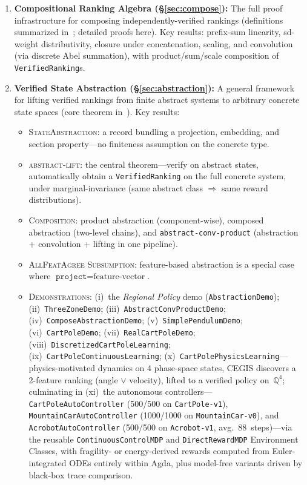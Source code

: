 \documentclass[9pt,a4paper]{article}
\theoremstyle{plain}
\theoremstyle{definition}
\theoremstyle{remark}
\begin{document}
\begin{enumerate}
\item \textbf{Compositional Ranking Algebra (\S\ref{sec:compose}):} The full proof infrastructure for composing independently-verified rankings (definitions summarized in~\cite{CSHRLSuccessor}; detailed proofs here).  Key results: prefix-sum linearity, sd-weight distributivity, closure under concatenation, scaling, and convolution (via discrete Abel summation), with product/sum/scale composition of \texttt{VerifiedRanking}s.

\item \textbf{Verified State Abstraction (\S\ref{sec:abstraction}):} A general framework for lifting verified rankings from finite abstract systems to arbitrary concrete state spaces (core theorem in~\cite{CSHRLSuccessor}).  Key results:
\begin{itemize}
\item \textsc{StateAbstraction}: a record bundling a projection, embedding, and section property---no finiteness assumption on the concrete type.
\item \textsc{abstract-lift}: the central theorem---verify on abstract states, automatically obtain a \texttt{VerifiedRanking} on the full concrete system, under marginal-invariance (same abstract class $\Rightarrow$ same reward distributions).
\item \textsc{Composition}: product abstraction (component-wise), composed abstraction (two-level chains), and \texttt{abstract-conv-product} (abstraction + convolution + lifting in one pipeline).
\item \textsc{AllFeatAgree Subsumption}: feature-based abstraction is a special case where $\texttt{project} = \text{feature-vector}$.
\item \textsc{Demonstrations}: (i)~the \emph{Regional Policy} demo (\texttt{AbstractionDemo}); (ii)~\texttt{ThreeZoneDemo}; (iii)~\texttt{AbstractConvProductDemo}; (iv)~\texttt{ComposeAbstractionDemo}; (v)~\texttt{SimplePendulumDemo}; (vi)~\texttt{CartPoleDemo}; (vii)~\texttt{RealCartPoleDemo}; (viii)~\texttt{DiscretizedCartPoleLearning}; (ix)~\texttt{CartPoleContinuousLearning}; (x)~\texttt{CartPolePhysicsLearning}---physics-motivated dynamics on 4 phase-space states, CEGIS discovers a 2-feature ranking (angle $\vee$ velocity), lifted to a verified policy on~$\mathbb{Q}^4$; culminating in (xi)~the autonomous controllers---\texttt{CartPoleAutoController} (500/500 on \texttt{CartPole-v1}), \texttt{MountainCarAutoController} (1000/1000 on \texttt{MountainCar-v0}), and \texttt{AcrobotAutoController} (500/500 on \texttt{Acrobot-v1}, avg.\ 88~steps)---via the reusable \texttt{ContinuousControlMDP} and \texttt{DirectRewardMDP} Environment Classes, with fragility- or energy-derived rewards computed from Euler-integrated ODEs entirely within Agda, plus model-free variants driven by black-box trace comparison.
\end{itemize}


\end{enumerate}
\end{document}

